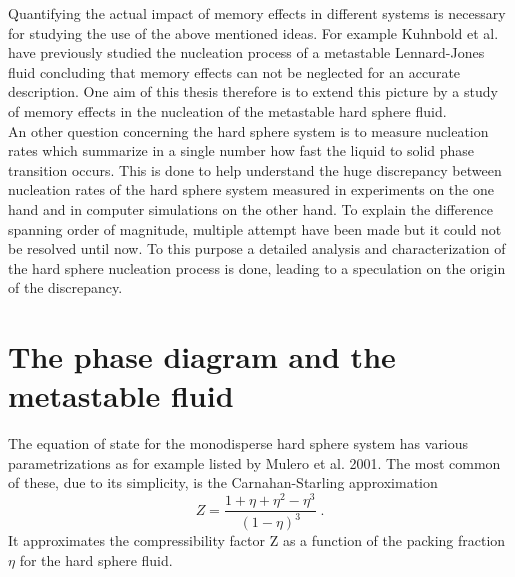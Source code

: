 Quantifying the actual impact of memory effects in different systems is necessary for studying the use of the above mentioned ideas. For example Kuhnbold et al.\cite{Kuhnbold2019} have previously studied the nucleation process of a metastable Lennard-Jones fluid concluding that memory effects can not be neglected for an accurate description. One aim of this thesis therefore is to extend this picture by a study of memory effects in the nucleation of the metastable hard sphere fluid.\\

An other question concerning the hard sphere system is to measure nucleation rates which summarize in a single number how fast the liquid to solid phase transition occurs. This is done to help understand the huge discrepancy between nucleation rates of the hard sphere system measured in experiments on the one hand and in computer simulations on the other hand. To explain the difference spanning order of magnitude, multiple attempt have been made but it could not be resolved until now. To this purpose a detailed analysis and characterization of the hard sphere nucleation process is done, leading to a speculation on the origin of the discrepancy.\\

\section{The phase diagram and the metastable fluid}
\label{sec:HS_phase_diagram}
The equation of state for the monodisperse hard sphere system has various parametrizations as for example listed by Mulero et al. 2001\cite{Mulero2001}. The most common of these, due to its simplicity, is the Carnahan-Starling approximation\cite{Carnahan1969}
\begin{equation}
\label{eqn:CS}
Z=\frac{1+\eta+\eta^2-\eta^3}{(1-\eta)^3} \; \text{.}
\end{equation}
It approximates the compressibility factor Z as a function of the packing fraction $\eta$ for the hard sphere fluid.\\

